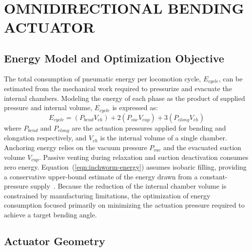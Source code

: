 

\section{OMNIDIRECTIONAL BENDING ACTUATOR}
\label{sec:inchworm-actuator}

\subsection{Energy Model and Optimization Objective}

The total consumption of pneumatic energy per locomotion cycle,
$E_{cycle}$, can be estimated from the mechanical work required to
pressurize and evacuate the internal chambers. Modeling the energy of each
phase as the product of supplied pressure and internal volume, $E_{cycle}$
is expressed as:
\begin{equation}
	E_{cycle} = (P_{bend} V_{ch}) + 2(P_{vac} V_{cup}) + 3(P_{elong} V_{ch})
	\label{eqn:inchworm-energy}
\end{equation}
where $P_{bend}$ and $P_{elong}$ are the actuation pressures applied for
bending and elongation respectively, and $V_{ch}$ is the internal volume of
a single chamber. Anchoring energy relies on the vacuum pressure $P_{vac}$
and the evacuated suction volume $V_{cup}$. Passive venting during
relaxation and suction deactivation consumes zero energy.
Equation~(\ref{eqn:inchworm-energy}) assumes isobaric filling, providing a
conservative upper-bound estimate of the energy drawn from a
constant-pressure supply~\cite{Tolley2014Resilient}. Because the reduction
of the internal chamber volume is constrained by manufacturing limitations,
the optimization of energy consumption focused primarily on minimizing the
actuation pressure required to achieve a target bending angle.

\subsection{Actuator Geometry}

